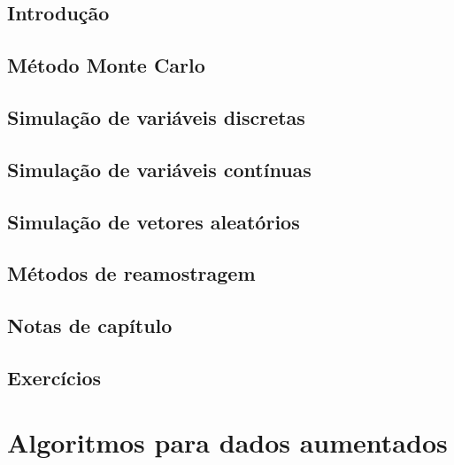 \documentclass[
]{latex/krantz}
\theoremstyle{definition}
\theoremstyle{definition}
\theoremstyle{definition}
\theoremstyle{definition}
\theoremstyle{remark}
\begin{document}
\hypertarget{introduuxe7uxe3o-14}{%
\section{Introdução}\label{introduuxe7uxe3o-14}}

\hypertarget{muxe9todo-monte-carlo}{%
\section{Método Monte Carlo}\label{muxe9todo-monte-carlo}}

\hypertarget{simulauxe7uxe3o-de-variuxe1veis-discretas}{%
\section{Simulação de variáveis discretas}\label{simulauxe7uxe3o-de-variuxe1veis-discretas}}

\hypertarget{simulauxe7uxe3o-de-variuxe1veis-contuxednuas}{%
\section{Simulação de variáveis contínuas}\label{simulauxe7uxe3o-de-variuxe1veis-contuxednuas}}

\hypertarget{simulauxe7uxe3o-de-vetores-aleatuxf3rios}{%
\section{Simulação de vetores aleatórios}\label{simulauxe7uxe3o-de-vetores-aleatuxf3rios}}

\hypertarget{muxe9todos-de-reamostragem}{%
\section{Métodos de reamostragem}\label{muxe9todos-de-reamostragem}}

\hypertarget{notas-de-capuxedtulo-14}{%
\section{Notas de capítulo}\label{notas-de-capuxedtulo-14}}

\hypertarget{exercuxedcios-14}{%
\section{Exercícios}\label{exercuxedcios-14}}

\hypertarget{algoritmos-para-dados-aumentados}{%
\chapter{Algoritmos para dados aumentados}\label{algoritmos-para-dados-aumentados}}
\end{document}
